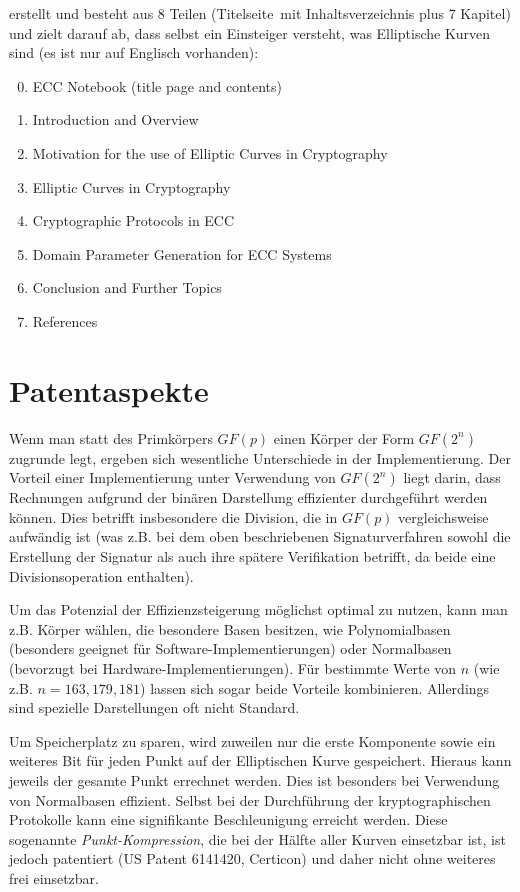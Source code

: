 \begin{refsegment}
{}
erstellt und besteht aus 8 Teilen (\glqq Titelseite\grqq~mit Inhaltsverzeichnis
plus 7 Kapitel) und zielt darauf ab, dass selbst ein Einsteiger versteht, was
Elliptische Kurven sind (es ist nur auf Englisch vorhanden):
\begin{enumerate}
   \setcounter{enumi}{-1}
   \item ECC Notebook (title page and contents)
   \item Introduction and Overview
   \item Motivation for the use of Elliptic Curves in Cryptography
   \item Elliptic Curves in Cryptography
   \item Cryptographic Protocols in ECC
   \item Domain Parameter Generation for ECC Systems
   \item Conclusion and Further Topics
   \item References
\end{enumerate}


\newpage
\section{Patentaspekte}

Wenn man statt des Primkörpers $GF(p)$ einen Körper der Form $GF(2^n)$ zugrunde legt, ergeben sich wesentliche Unterschiede in der Implementierung. Der Vorteil einer Implementierung unter Verwendung von $GF(2^n)$ liegt darin, dass Rechnungen aufgrund der binären Darstellung effizienter durchgeführt werden können. Dies betrifft insbesondere die Division, die in $GF(p)$ vergleichsweise aufwändig ist (was z.B. bei dem oben beschriebenen Signaturverfahren sowohl die Erstellung der Signatur als auch ihre spätere Verifikation betrifft, da beide eine Divisionsoperation enthalten).

Um das Potenzial der Effizienzsteigerung möglichst optimal zu nutzen, kann man z.B. Körper wählen, die besondere Basen besitzen, wie Polynomialbasen (besonders geeignet für Software-Implementierungen) oder Normalbasen (bevorzugt bei Hardware-Implementierungen). Für bestimmte Werte von $n$ (wie z.B. $n=163,179,181$) lassen sich sogar beide Vorteile kombinieren. Allerdings sind spezielle Darstellungen oft nicht Standard.

Um Speicherplatz zu sparen, wird zuweilen nur die erste Komponente sowie ein weiteres Bit für jeden Punkt auf der Elliptischen Kurve gespeichert. Hieraus kann jeweils der gesamte Punkt errechnet werden. Dies ist besonders bei Verwendung von Normalbasen effizient. Selbst bei der Durchführung der kryptographischen Protokolle kann eine signifikante Beschleunigung erreicht werden. Diese sogenannte {\it Punkt-Kompression}, die bei der Hälfte aller Kurven einsetzbar ist, ist jedoch patentiert (US Patent 6141420, Certicon) und daher nicht ohne weiteres frei einsetzbar.


\end{refsegment}
